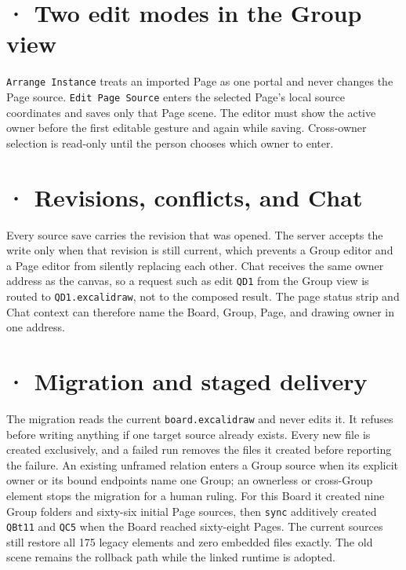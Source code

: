 \section{· Two edit modes in the Group view}
\texttt{Arrange Instance} treats an imported Page as one portal and never changes the Page source. \texttt{Edit Page Source} enters the selected Page's local source coordinates and saves only that Page scene. The editor must show the active owner before the first editable gesture and again while saving. Cross-owner selection is read-only until the person chooses which owner to enter.

\section{· Revisions, conflicts, and Chat}
Every source save carries the revision that was opened. The server accepts the write only when that revision is still current, which prevents a Group editor and a Page editor from silently replacing each other. Chat receives the same owner address as the canvas, so a request such as edit \texttt{QD1} from the Group view is routed to \texttt{QD1.excalidraw}, not to the composed result. The page status strip and Chat context can therefore name the Board, Group, Page, and drawing owner in one address.

\section{· Migration and staged delivery}
The migration reads the current \texttt{board.excalidraw} and never edits it. It refuses before writing anything if one target source already exists. Every new file is created exclusively, and a failed run removes the files it created before reporting the failure. An existing unframed relation enters a Group source when its explicit owner or its bound endpoints name one Group; an ownerless or cross-Group element stops the migration for a human ruling. For this Board it created nine Group folders and sixty-six initial Page sources, then \texttt{sync} additively created \texttt{QBt11} and \texttt{QC5} when the Board reached sixty-eight Pages. The current sources still restore all 175 legacy elements and zero embedded files exactly. The old scene remains the rollback path while the linked runtime is adopted.
